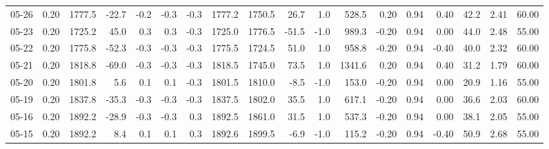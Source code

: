 \begin{threeparttable}
{\begin{tabular}{lrrrrrrrrrrrrrrrrr}
  05-26 &     0.20 & 1777.5 &             -22.7 &              -0.2 &               -0.3 &               -0.3 & 1777.2 & 1750.5 &       26.7 &                      1.0 &               528.5 &       0.20 &      0.94 &           0.40 &             42.2 &            2.41 &                  60.00 \\
  05-23 &     0.20 & 1725.2 &              45.0 &               0.3 &                0.3 &               -0.3 & 1725.0 & 1776.5 &      -51.5 &                     -1.0 &               989.3 &      -0.20 &      0.94 &           0.00 &             44.0 &            2.48 &                  55.00 \\
  05-22 &     0.20 & 1775.8 &             -52.3 &              -0.3 &               -0.3 &               -0.3 & 1775.5 & 1724.5 &       51.0 &                      1.0 &               958.8 &      -0.20 &      0.94 &          -0.40 &             40.0 &            2.32 &                  60.00 \\
  05-21 &     0.20 & 1818.8 &             -69.0 &              -0.3 &               -0.3 &               -0.3 & 1818.5 & 1745.0 &       73.5 &                      1.0 &              1341.6 &       0.20 &      0.94 &           0.40 &             31.2 &            1.79 &                  60.00 \\
  05-20 &     0.20 & 1801.8 &               5.6 &               0.1 &                0.1 &               -0.3 & 1801.5 & 1810.0 &       -8.5 &                     -1.0 &               153.0 &      -0.20 &      0.94 &           0.00 &             20.9 &            1.16 &                  55.00 \\
  05-19 &     0.20 & 1837.8 &             -35.3 &              -0.3 &               -0.3 &               -0.3 & 1837.5 & 1802.0 &       35.5 &                      1.0 &               617.1 &      -0.20 &      0.94 &           0.00 &             36.6 &            2.03 &                  60.00 \\
  05-16 &     0.20 & 1892.2 &             -28.9 &              -0.3 &               -0.3 &                0.3 & 1892.5 & 1861.0 &       31.5 &                      1.0 &               537.3 &      -0.20 &      0.94 &           0.00 &             38.1 &            2.05 &                  55.00 \\
  05-15 &     0.20 & 1892.2 &               8.4 &               0.1 &                0.1 &                0.3 & 1892.6 & 1899.5 &       -6.9 &                     -1.0 &               115.2 &      -0.20 &      0.94 &          -0.40 &             50.9 &            2.68 &                  55.00 \\

\end{tabular}}
\end{threeparttable}
